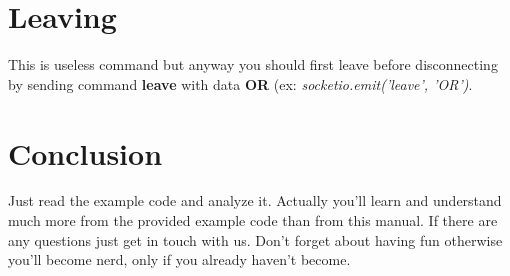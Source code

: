 \documentclass[10pt]{article}
\begin{document}
\section{Leaving}
This is useless command but anyway you should first leave before disconnecting by sending command \textbf{leave} with data \textbf{OR} (ex: \textit{socketio.emit('leave', 'OR')}.

\section{Conclusion}
Just read the example code and analyze it. Actually you'll learn and understand much more from the provided example code than from this manual. If there are any questions just get in touch with us. Don't forget about having fun otherwise you'll become nerd, only if you already haven't become.
\end{document}

